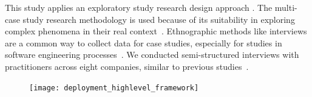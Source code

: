 

This study applies an exploratory \DIFdelbegin {}\DIFdelend \DIFaddbegin {}\DIFaddend study research design approach \cite{runeson2009guidelines}. The multi-case study research methodology is used because of its suitability in exploring complex phenomena in their real context~\cite{easterbrook2008selecting, runeson2009guidelines}. Ethnographic methods like interviews are a common way to collect data for case studies, especially for studies in software engineering processes~\cite{giray2021software}. We conducted semi-structured interviews with practitioners across eight companies, similar to previous studies~\cite{shankar2022operationalizing, baier2019challenges, lwakatare2019taxonomy}.

\DIFaddbegin \begin{figure}[h]
\centering
\texttt{[image: deployment\_highlevel\_framework]}
\caption{}
\label{fig:deployment_highlevel_framework}
\end{figure}


